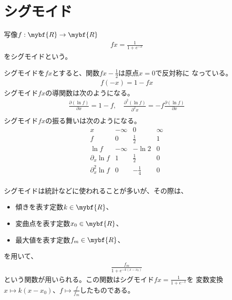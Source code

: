 \section{シグモイド}\label{s1:シグモイド} %
	\begin{definition}[シグモイド]\label{def:シグモイド} %
		写像$f:\mybf{R}\to\mybf{R}$
		\begin{equation*}\begin{split} %
			fx = \frac{1}{1+e^{-x}}
		\end{split}\end{equation*} %
		をシグモイドという。
	\end{definition} %
	シグモイドを$fx$とすると、関数$fx-\frac{1}{2}$は原点$x=0$で反対称に
	なっている。
	\begin{equation*}\begin{split} %
		f(-x) = 1-fx
	\end{split}\end{equation*} %
	シグモイド$fx$の導関数は次のようになる。
	\begin{equation*}\begin{split} %
		\frac{\partial(\ln f)}{\partial x} = 1 - f
		,\quad \frac{\partial^2(\ln f)}{\partial^2 x} 
			= -f\frac{\partial(\ln f)}{\partial x} \\
	\end{split}\end{equation*} %
	シグモイド$fx$の振る舞いは次のようになる。
	\begin{equation*}\begin{matrix}
		x & -\infty & 0 & \infty \\
		f & 0 & \frac{1}{2} & 1 \\
		\ln f & -\infty & - \ln2 & 0 \\
		\partial_x \ln f & 1 & \frac{1}{2} & 0 \\
		\partial_x^2 \ln f & 0 & -\frac{1}{4} & 0 \\
	\end{matrix}\end{equation*} %

	シグモイドは統計などに使われることが多いが、その際は、
	\begin{itemize}\setlength{\itemsep}{-1mm} %
		\item 傾きを表す定数$k\in\mybf{R}$、
		\item 変曲点を表す定数$x_0\in\mybf{R}$、
		\item 最大値を表す定数$f_m\in\mybf{R}$、
	\end{itemize} %
	を用いて、
	\begin{equation*}\begin{split} %
		\frac{f_m}{1+e^{-k(x-x_0)}}
	\end{split}\end{equation*} %
	という関数が用いられる。この関数はシグモイド$fx=\frac{1}{1+e^{-x}}$を
	変数変換$x\mapsto k(x-x_0)$、$f\mapsto \frac{f}{f_m}$したものである。

